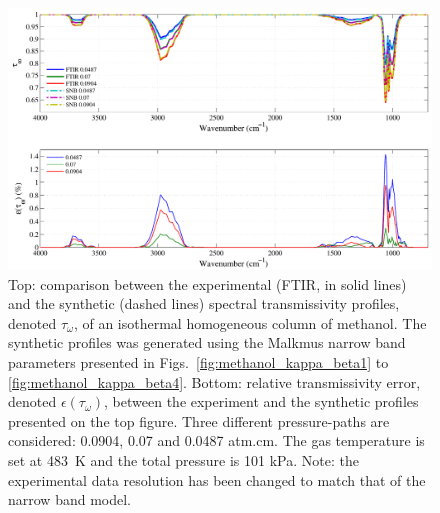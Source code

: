 \begin{figure}[p]
\includegraphics[width=\textwidth]{Figures/Comparison_Fit_Methanol_MALKMUS_Temp483K.pdf}
\caption{Top: comparison between the experimental (FTIR, in solid lines) and the synthetic (dashed lines) spectral transmissivity profiles, denoted $\tau_{\omega}$, of an isothermal homogeneous column of methanol. The synthetic profiles was generated using the Malkmus narrow band parameters presented in Figs.~\ref{fig:methanol_kappa_beta1} to \ref{fig:methanol_kappa_beta4}. Bottom: relative transmissivity error, denoted $\epsilon{(\tau_{\omega})}$, between the experiment and the synthetic profiles presented on the top figure. Three different pressure-paths are considered: 0.0904, 0.07 and 0.0487 atm.cm. The gas temperature is set at 483~K and the total pressure is 101 kPa. Note: the experimental data resolution has been changed to match that of the narrow band model. \label{fig:methanol_SNBVerify_483K}}
\end{figure}

